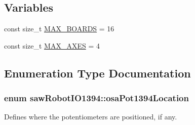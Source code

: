 \subsection*{Variables}
\begin{DoxyCompactItemize}
\item 
const size\-\_\-t \hyperlink{namespacesaw_robot_i_o1394_a2ea4cc88435b1ca85b6c633ba6360af4}{M\-A\-X\-\_\-\-B\-O\-A\-R\-D\-S} = 16
\item 
const size\-\_\-t \hyperlink{namespacesaw_robot_i_o1394_a397b95aa9a72ba9aaf6cf10c9ef6a37a}{M\-A\-X\-\_\-\-A\-X\-E\-S} = 4
\end{DoxyCompactItemize}


\subsection{Enumeration Type Documentation}
\hypertarget{namespacesaw_robot_i_o1394_a9d63d89648f679b6af5cf3f16576bde9}{
\subsubsection[{osa\-Pot1394\-Location}]{\setlength{\rightskip}{0pt plus 5cm}enum {\bf saw\-Robot\-I\-O1394\-::osa\-Pot1394\-Location}}}\label{namespacesaw_robot_i_o1394_a9d63d89648f679b6af5cf3f16576bde9}


Defines where the potentiometers are positioned, if any. 

